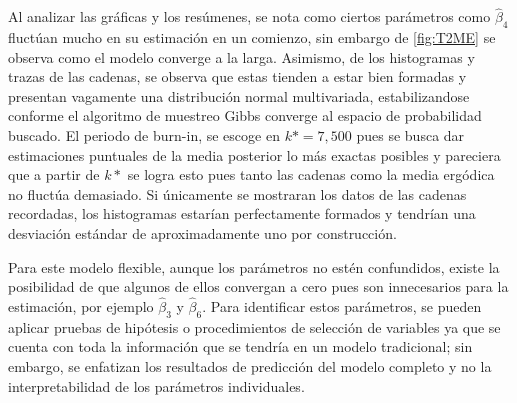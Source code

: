 \documentclass[../Main/Main.tex]{subfiles}
\begin{document}
Al analizar las gráficas y los resúmenes, se nota como ciertos parámetros como $\hat{\beta}_4$ fluctúan mucho en su estimación en un comienzo, sin embargo de \ref{fig:T2ME} se observa como el modelo converge a la larga. Asimismo, de los histogramas y trazas de las cadenas, se observa que estas tienden a estar bien formadas y presentan vagamente una distribución normal multivariada, estabilizandose conforme el algoritmo de muestreo Gibbs converge al espacio de probabilidad buscado. El periodo de burn-in, se escoge en $k* = 7,500$ pues se busca dar estimaciones puntuales de la media posterior lo más exactas posibles y pareciera que a partir de $k*$ se logra esto pues tanto las cadenas como la media ergódica no fluctúa demasiado. Si únicamente se mostraran los datos de las cadenas recordadas, los histogramas estarían perfectamente formados y tendrían una desviación estándar de aproximadamente uno por construcción.

Para este modelo flexible, aunque los parámetros no estén confundidos, existe la posibilidad de que algunos de ellos convergan a cero pues son innecesarios para la estimación, por ejemplo $\hat{\beta}_3$ y $\hat{\beta}_6$. Para identificar estos parámetros, se pueden aplicar pruebas de hipótesis o procedimientos de selección de variables ya que se cuenta con toda la información que se tendría en un modelo tradicional; sin embargo, se enfatizan los resultados de predicción del modelo completo y no la interpretabilidad de los parámetros individuales.
\end{document}

